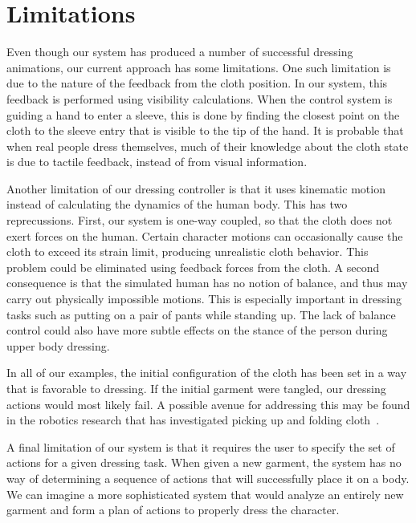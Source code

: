 \section{Limitations}

Even though our system has produced a number of successful dressing
animations, our current approach has some limitations.  One such
limitation is due to the nature of the feedback from the cloth position.
In our system, this feedback is performed using visibility calculations.
When the control system is guiding a hand to enter a sleeve, this is done
by finding the closest point on the cloth to the sleeve entry that is
visible to the tip of the hand.  It is probable that when real people
dress themselves, much of their knowledge about the cloth state is due
to tactile feedback, instead of from visual information.

Another limitation of our dressing controller is that it uses kinematic
motion instead of calculating the dynamics of the human body.  This has
two reprecussions.  First, our system is one-way coupled, so that the
cloth does not exert forces on the human.  Certain character motions can
occasionally cause the cloth to exceed its strain limit, producing
unrealistic cloth behavior.  This problem could be eliminated using
feedback forces from the cloth.  A second consequence is that the
simulated human has no notion of balance, and thus may carry out
physically impossible motions.  This is especially important in dressing
tasks such as putting on a pair of pants while standing up.  The lack of
balance control could also have more subtle effects on the stance of the
person during upper body dressing.

In all of our examples, the initial configuration of the cloth has been
set in a way that is favorable to dressing.  If the initial garment were
tangled, our dressing actions would most likely fail.  A possible avenue
for addressing this may be found in the robotics research that has
investigated picking up and folding cloth~\cite{Cusumano:2011:BCD}.

A final limitation of our system is that it requires the user to specify
the set of actions for a given dressing task.  When given a new garment,
the system has no way of determining a sequence of actions that will
successfully place it on a body.  We can imagine a more sophisticated
system that would analyze an entirely new garment and form a plan of
actions to properly dress the character.  

